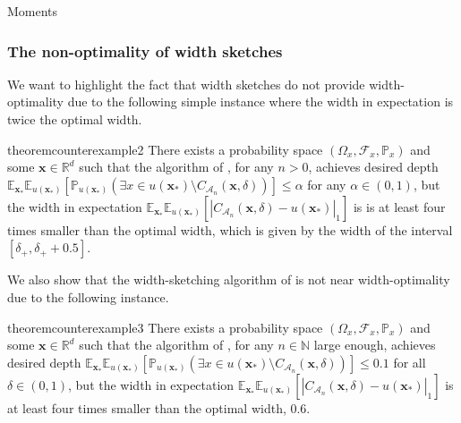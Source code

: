 \begin{assumptioni}[i.i.d data]
\begin{assumptioni}
\begin{assumptioni}{Moments}
\subsubsection{The non-optimality of width sketches} \label{sec:optimize}
We want to highlight the fact that width sketches do not provide width-optimality due to the following simple instance where the width in expectation is twice the optimal width.


\begin{restatable}{theorem}{counterexample2}\label{prop:counterexample2}
  There exists a probability space $(\Omega_x, \mathcal{F}_x,\mathbb{P}_x)$ and some $\bm{x} \in \mathbb{R}^d$ such that the algorithm of \cite{angelopoulos2024conformal}, for any $n > 0$, achieves desired depth $\mathbb{E}_{\bm{x}_*} \mathbb{E}_{u(\bm{x_*})}[\mathbb{P}_{u(\bm{x_*})}(\exists x \in u(\bm{x_*}) \setminus C_{\mathcal{A}_n}(\bm{x},\delta))]  \leq \alpha$ for any $\alpha \in (0,1)$, but the width in expectation $\mathbb{E}_{\bm{x}_*} \mathbb{E}_{u(\bm{x_*})}[|C_{\mathcal{A}_n}(\bm{x},\delta) - u(\bm{x_*})|_1]$ is is at least four times smaller than the optimal width, which is given by the width of the interval $[\delta_{+},\delta_{+}+0.5]$.

\end{restatable}

We also show that the width-sketching algorithm of \cite{angelopoulos2024conformal} is not near width-optimality due to the following instance.

\begin{restatable}{theorem}{counterexample3}\label{prop:counterexample3}
  There exists a probability space $(\Omega_x, \mathcal{F}_x,\mathbb{P}_x)$ and some $\bm{x} \in \mathbb{R}^d$ such that the algorithm of \cite{angelopoulos2024conformal}, for any $n \in \mathbb{N}$ large enough, achieves desired depth $\mathbb{E}_{\bm{x}_*} \mathbb{E}_{u(\bm{x_*})}[\mathbb{P}_{u(\bm{x_*})}(\exists x \in u(\bm{x_*}) \setminus C_{\mathcal{A}_n}(\bm{x},\delta))]  \leq 0.1$ for all $\delta \in (0,1)$, but the width in expectation $\mathbb{E}_{\bm{x}_*} \mathbb{E}_{u(\bm{x_*})}[|C_{\mathcal{A}_n}(\bm{x},\delta) - u(\bm{x_*})|_1]$ is at least four times smaller than the optimal width, 0.6.

\end{restatable}


\end{assumptioni}
\end{assumptioni}
\end{assumptioni}
